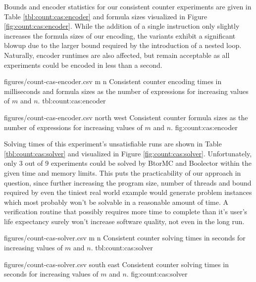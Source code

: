 \newpage

Bounds and encoder statistics for our consistent counter experiments are given in Table \ref{tbl:count:cas:encoder} and formula sizes visualized in Figure \ref{fig:count:cas:encoder}.
While the addition of a single instruction only slightly increases the formula sizes of our {\BTOR} encoding, the {\SMTLIB} variants exhibit a significant blowup due to the larger bound required by the introduction of a nested loop.
Naturally, encoder runtimes are also affected, but remain acceptable as all experiments could be encoded in less than a second.

\bigbreak

\EncoderStatsTable
  {figures/count-cas-encoder.csv}
  {m n}
  {\CountRowHeader}
  {Consistent counter encoding times in milliseconds and formula sizes as the number of expressions for increasing values of $m$ and $n$.}
  {tbl:count:cas:encoder}

\EncoderStatsGraph
  {figures/count-cas-encoder.csv}
  {north west}
  {Consistent counter formula sizes as the number of expressions for increasing values of $m$ and $n$.}
  {fig:count:cas:encoder}

\newpage

Solving times of this experiment's unsatisfiable runs are shown in Table \ref{tbl:count:cas:solver} and visualized in Figure \ref{fig:count:cas:solver}.
Unfortunately, only 3 out of 9 experiments could be solved by BtorMC and Boolector within the given time and memory limits.
This puts the practicability of our approach in question, since further increasing the program size, number of threads and bound required by even the tiniest real world example
would generate problem instances which most probably won't be solvable in a reasonable amount of time.
A verification routine that possibly requires more time to complete than it's user's life expectancy surely won't increase software quality, not even in the long run.

\vfill

\SolverStatsTable
  {figures/count-cas-solver.csv}
  {m n}
  {\CountRowHeader}
  {Consistent counter solving times in seconds for increasing values of $m$ and $n$.}
  {tbl:count:cas:solver}

\SolverStatsGraph
  {figures/count-cas-solver.csv}
  {south east}
  {Consistent counter solving times in seconds for increasing values of $m$ and $n$.}
  {fig:count:cas:solver}
